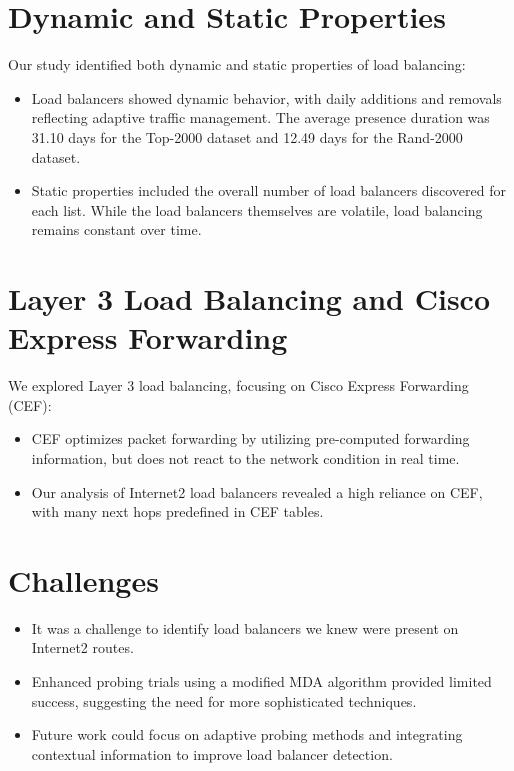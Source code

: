 \documentclass[12pt]{cwru_thesis}
\begin{document}
\section*{Dynamic and Static Properties}

Our study identified both dynamic and static properties of load balancing:
\begin{itemize}
    \item Load balancers showed dynamic behavior, with daily additions and removals reflecting adaptive traffic management. The average presence duration was 31.10 days for the Top-2000 dataset and 12.49 days for the Rand-2000 dataset.
    \item Static properties included the overall number of load balancers discovered for each list. While the load balancers themselves are volatile, load balancing remains constant over time.
    
\end{itemize}

\section*{Layer 3 Load Balancing and Cisco Express Forwarding}

We explored Layer 3 load balancing, focusing on Cisco Express Forwarding (CEF):
\begin{itemize}
    \item CEF optimizes packet forwarding by utilizing pre-computed forwarding information, but does not react to the network condition in real time.
    \item Our analysis of Internet2 load balancers revealed a high reliance on CEF, with many next hops predefined in CEF tables. 
\end{itemize}

\section*{Challenges}

\begin{itemize}
    \item It was a challenge to identify load balancers we knew were present on Internet2 routes.
    \item Enhanced probing trials using a modified MDA algorithm provided limited success, suggesting the need for more sophisticated techniques.
    \item Future work could focus on adaptive probing methods and integrating contextual information to improve load balancer detection.
\end{itemize}
\end{document}

